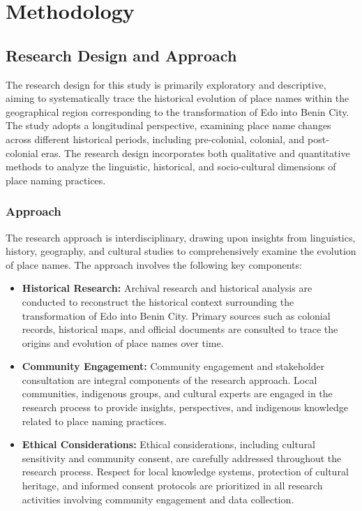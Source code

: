 \chapter{Methodology}

\section{Research Design and Approach}

The research design for this study is primarily exploratory and descriptive, aiming to systematically trace the historical evolution of place names within the geographical region corresponding to the transformation of Edo into Benin City. The study adopts a longitudinal perspective, examining place name changes across different historical periods, including pre-colonial, colonial, and post-colonial eras. The research design incorporates both qualitative and quantitative methods to analyze the linguistic, historical, and socio-cultural dimensions of place naming practices.

\subsection{Approach}

The research approach is interdisciplinary, drawing upon insights from linguistics, history, geography, and cultural studies to comprehensively examine the evolution of place names. The approach involves the following key components:

\begin{itemize}
    \item \textbf{Historical Research:} Archival research and historical analysis are conducted to reconstruct the historical context surrounding the transformation of Edo into Benin City. Primary sources such as colonial records, historical maps, and official documents are consulted to trace the origins and evolution of place names over time.
    
    \item \textbf{Community Engagement:} Community engagement and stakeholder consultation are integral components of the research approach. Local communities, indigenous groups, and cultural experts are engaged in the research process to provide insights, perspectives, and indigenous knowledge related to place naming practices.
    
    \item \textbf{Ethical Considerations:} Ethical considerations, including cultural sensitivity and community consent, are carefully addressed throughout the research process. Respect for local knowledge systems, protection of cultural heritage, and informed consent protocols are prioritized in all research activities involving community engagement and data collection.
\end{itemize}

